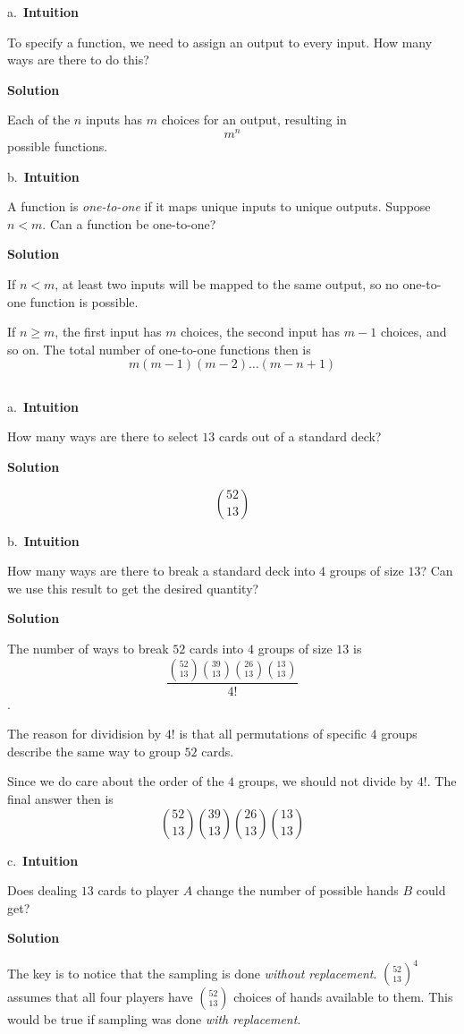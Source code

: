 \documentclass[]{book}
\begin{document}
a.~\textbf{Intuition}

To specify a function, we need to assign an output to every input. How
many ways are there to do this?

 \textbf{Solution}

Each of the \(n\) inputs has \(m\) choices for an output, resulting in
\[m^{n}\] possible functions.

b.~\textbf{Intuition}

A function is \emph{one-to-one} if it maps unique inputs to unique
outputs. Suppose \(n < m\). Can a function be one-to-one?

 \textbf{Solution}

If \(n < m\), at least two inputs will be mapped to the same output, so
no one-to-one function is possible.

If \(n \geq m\), the first input has \(m\) choices, the second input has
\(m - 1\) choices, and so on. The total number of one-to-one functions
then is \[m(m-1)(m-2)\dots(m-n+1)\]

\subsection{}\label{section-11}

a.~\textbf{Intuition}

How many ways are there to select \(13\) cards out of a standard deck?

 \textbf{Solution}

\[{52 \choose 13}\]

b.~\textbf{Intuition}

How many ways are there to break a standard deck into \(4\) groups of
size \(13\)? Can we use this result to get the desired quantity?

 \textbf{Solution}

The number of ways to break \(52\) cards into \(4\) groups of size
\(13\) is
\[\frac{{52 \choose 13}{39 \choose 13}{26 \choose 13}{13 \choose 13}}{4!}\].

The reason for dividision by \(4!\) is that all permutations of specific
\(4\) groups describe the same way to group \(52\) cards.

Since we do care about the order of the \(4\) groups, we should not
divide by \({4!}\). The final answer then is
\[{52 \choose 13}{39 \choose 13}{26 \choose 13}{13 \choose 13}\]

c.~\textbf{Intuition}

Does dealing \(13\) cards to player \(A\) change the number of possible
hands \(B\) could get?

 \textbf{Solution}

The key is to notice that the sampling is done \emph{without
replacement}. \({52 \choose 13}^{4}\) assumes that all four players have
\({52 \choose 13}\) choices of hands available to them. This would be
true if sampling was done \emph{with replacement}.


\end{document}
